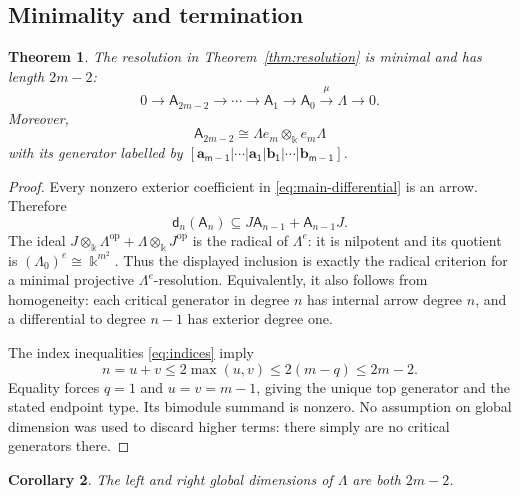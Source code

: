 \documentclass[a4paper,11pt,oneside,reqno]{amsart}
\newtheorem{theorem}{Theorem}[section]
\newtheorem{corollary}[theorem]{Corollary}
\theoremstyle{definition}
\numberwithin{equation}{section}
\begin{document}
\subsection{Minimality and termination}
	\label{sec:minimality}
	
	\begin{theorem}\label{thm:minimal}
		The resolution in Theorem~\ref{thm:resolution} is minimal and has length
		$2m-2$:
		\begin{equation}\label{eq:finite-resolution}
			0\longrightarrow \mathsf A_{2m-2}\longrightarrow\cdots\longrightarrow
			\mathsf A_1\longrightarrow \mathsf A_0\xrightarrow{\mu}\Lambda\longrightarrow0.
		\end{equation}
		Moreover,
		\[
		\mathsf A_{2m-2}\cong\Lambda e_m\otimes_{\Bbbk} e_m\Lambda
		\]
		with its generator labelled by
		$\mathsf{[\mathbf{a}_{m-1}|\cdots|\mathbf{a}_1|\mathbf{b}_1|\cdots|\mathbf{b}_{m-1}]}$.
	\end{theorem}
	
	\begin{proof}
		Every nonzero exterior coefficient in \eqref{eq:main-differential} is an
		arrow.  Therefore
		\[
		\mathsf d_n(\mathsf A_n)\subseteq J\mathsf A_{n-1}+\mathsf A_{n-1}J.
		\]
		The ideal
		$J\otimes_{\Bbbk}\Lambda^{\mathrm{op}}+
		\Lambda\otimes_{\Bbbk}J^{\mathrm{op}}$ is the radical of $\Lambda^e$:
		it is nilpotent and its quotient is $(\Lambda_0)^e\cong \Bbbk^{m^2}$.
		Thus the displayed inclusion is exactly the radical criterion for a
		minimal projective $\Lambda^e$-resolution.  Equivalently, it also follows
		from homogeneity: each critical generator in degree $n$ has internal
		arrow degree $n$, and a differential to degree $n-1$ has exterior degree
		one.
		
		The index inequalities \eqref{eq:indices} imply
		\[
		n=u+v\leq2\max(u,v)\leq2(m-q)\leq2m-2.
		\]
		Equality forces $q=1$ and $u=v=m-1$, giving the unique top generator and
		the stated endpoint type.  Its bimodule summand is nonzero.
		No assumption on global dimension was used to discard higher terms:
		there simply are no critical generators there.
	\end{proof}
	
	\begin{corollary}\label{cor:gldim}
		The left and right global dimensions of $\Lambda$ are both $2m-2$.
	\end{corollary}
	
\end{document}
